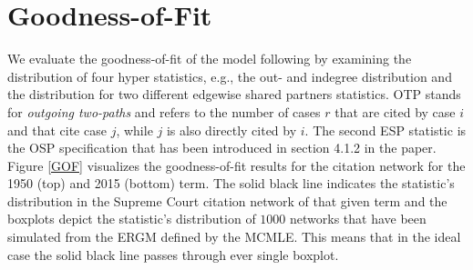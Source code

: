 \documentclass[headsepline=true, abstracton]{scrartcl}
\begin{document}
\section{Goodness-of-Fit}
We evaluate the goodness-of-fit of the model following \citet{hunter2008goodness} by examining the distribution of four hyper statistics, e.g., the out- and indegree distribution and the distribution for two different edgewise shared partners statistics. OTP stands for \textit{outgoing two-paths} and refers to the number of cases $r$ that are cited by case $i$ and that cite case $j$, while $j$ is also directly cited by $i$. The second ESP statistic is the OSP specification that has been introduced in section 4.1.2 in the paper. Figure \ref{GOF} visualizes the goodness-of-fit results for the citation network for the 1950 (top) and 2015 (bottom) term. The solid black line indicates the statistic's distribution in the Supreme Court citation network of that given term and the boxplots depict the statistic's distribution of $1000$ networks that have been simulated from the ERGM defined by the MCMLE. This means that in the ideal case the solid black line passes through ever single boxplot.
\end{document}
